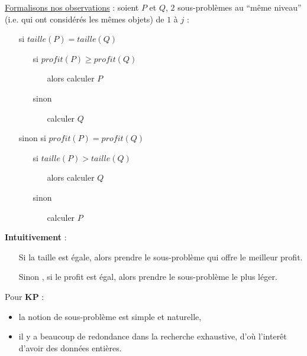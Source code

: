 \documentclass[12pt]{article}
\newcommand{\titre}[1]{\textcolor{title}{#1}}
\begin{document}
\noindent \underline{Formalisons nos observations} : soient $P$ et $Q$, $2$ sous-problèmes au ``même niveau''  \\ (i.e. qui ont considérés
les mêmes objets) de $1$ à $j$ :
\begin{itemize}
\item[si] $taille(P) = taille(Q)$
	\begin{itemize}
	\item[si] $profit(P) \geq profit(Q)$
	\begin{itemize}
		\item[alors] calculer $P$
	\end{itemize}
	\item[sinon] $ $
		\begin{itemize}
			\item[calculer] $Q$
		\end{itemize}
	\end{itemize}
\item[sinon si] $profit(P) = profit(Q)$
	\begin{itemize}
	\item[si] $taille(P) > taille (Q)$
		\begin{itemize}
			\item[alors] calculer $Q$
		\end{itemize}
	\item[sinon]$ $
		\begin{itemize}
			\item[calculer] $P$
		\end{itemize}
	\end{itemize}
\end{itemize}

\textbf{Intuitivement} :
\begin{itemize}
	\item[Si] la taille est égale, alors prendre le sous-problème qui offre le
		meilleur profit.
	\item[Sinon], si le profit est égal, alors prendre le sous-problème le plus léger.
\end{itemize}

\noindent Pour \textbf{\titre{KP}} :
\begin{itemize}
\item la notion de sous-problème est simple et naturelle,
\item il y a beaucoup de redondance dans la recherche exhaustive, d'où l'interêt d'avoir des données entières.
\end{itemize}
\end{document}
